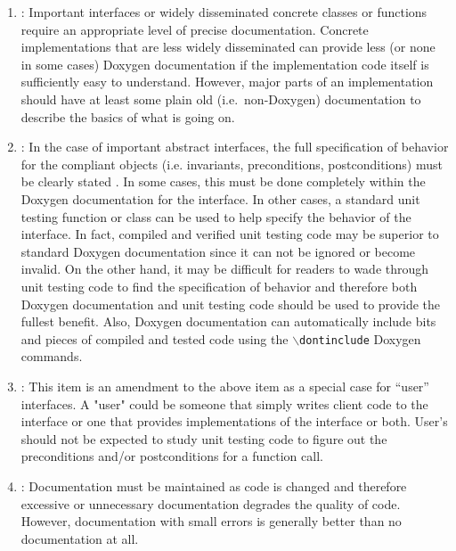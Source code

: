 \begin{enumerate}

{}\item\DOXGVariableLevelOfDetail: Important interfaces or widely disseminated
concrete classes or functions require an appropriate level of precise
documentation.  Concrete implementations that are less widely disseminated can
provide less (or none in some cases) Doxygen documentation if the
implementation code itself is sufficiently easy to understand.  However, major
parts of an implementation should have at least some plain old (i.e.\
non-Doxygen) documentation to describe the basics of what is going on.

{}\item\DOXGFullyDocumentInterfaces: In the case of important abstract
interfaces, the full specification of behavior for the compliant objects
(i.e. invariants, preconditions, postconditions) must be clearly stated
{}\cite[Item 69]{C++CodingStandards05}.  In some cases, this must be done
completely within the Doxygen documentation for the interface.  In other
cases, a standard unit testing function or class can be used to help specify
the behavior of the interface.  In fact, compiled and verified unit testing
code may be superior to standard Doxygen documentation since it can not be
ignored or become invalid.  On the other hand, it may be difficult for readers
to wade through unit testing code to find the specification of behavior and
therefore both Doxygen documentation and unit testing code should be used to
provide the fullest benefit.  Also, Doxygen documentation can automatically
include bits and pieces of compiled and tested code using the
{}\texttt{$\backslash$dontinclude} Doxygen commands.

{}\item\DOXGFullyDocumentUserIntefaces: This item is an amendment to the above
item as a special case for ``user'' interfaces.  A "user" could be someone
that simply writes client code to the interface or one that provides
implementations of the interface or both.  User's should not be expected to
study unit testing code to figure out the preconditions and/or postconditions
for a function call.

{}\item\DOXGWrongDocumentationBad: Documentation must be maintained as code is
changed and therefore excessive or unnecessary documentation degrades the
quality of code.  However, documentation with small errors is generally better
than no documentation at all.


\end{enumerate}
